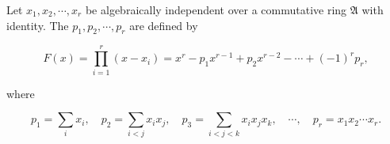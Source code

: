 Let $x_1, x_2, \cdots, x_r$ be algebraically independent over a commutative ring $\mathfrak{A}$ with identity. The  $p_1, p_2, \cdots, p_r$ are defined by

$$F(x) = \prod_{i=1}^r (x - x_i) = x^r - p_1 x^{r-1} + p_2 x^{r-2} - \cdots + (-1)^r p_r,$$

where

$$p_1 = \sum_i x_i, \quad p_2 = \sum_{i < j} x_i x_j, \quad p_3 = \sum_{i < j < k} x_i x_j x_k, \quad \cdots, \quad p_r = x_1 x_2 \cdots x_r.$$
